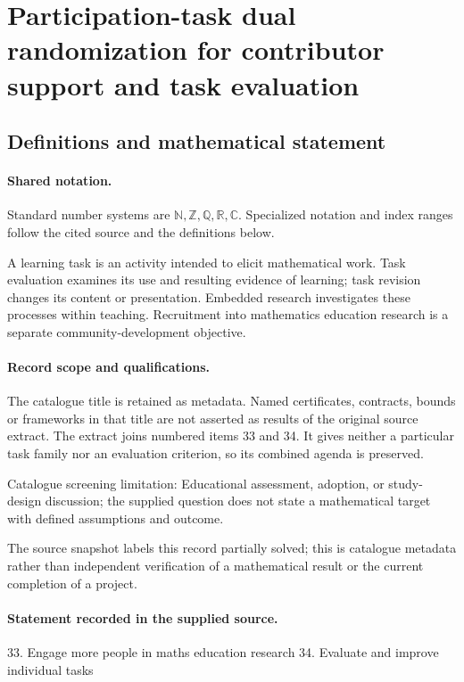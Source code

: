 \documentclass[11pt]{article}
\begin{document}
\section{Participation-task dual randomization for contributor support and task evaluation}\label{statement}

\subsection{Definitions and mathematical statement}

\paragraph{Shared notation.}Standard number systems are $\mathbb N,\mathbb Z,\mathbb Q,\mathbb R,\mathbb C$. Specialized notation and index ranges follow the cited source and the definitions below.


A learning task is an activity intended to elicit mathematical work. Task evaluation examines its use and resulting evidence of learning; task revision changes its content or presentation. Embedded research investigates these processes within teaching. Recruitment into mathematics education research is a separate community-development objective.
\paragraph{Record scope and qualifications.}
The catalogue title is retained as metadata. Named certificates, contracts, bounds or frameworks in that title are not asserted as results of the original source extract.
The extract joins numbered items 33 and 34. It gives neither a particular task family nor an evaluation criterion, so its combined agenda is preserved.

Catalogue screening limitation: Educational assessment, adoption, or study-design discussion; the supplied question does not state a mathematical target with defined assumptions and outcome.

The source snapshot labels this record partially solved; this is catalogue metadata rather than independent verification of a mathematical result or the current completion of a project.
\paragraph{Statement recorded in the supplied source.}
33. Engage more people in maths education research 34. Evaluate and improve individual tasks
\end{document}
